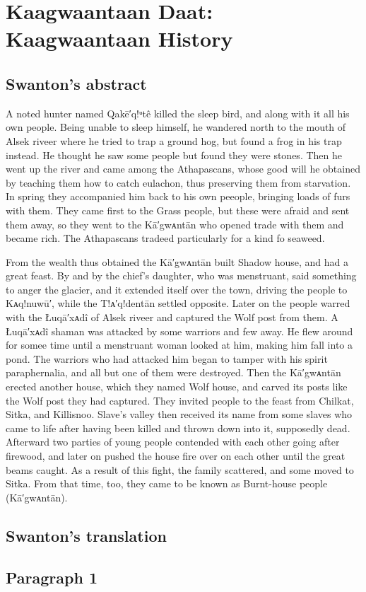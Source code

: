 
\resetexcnt
\chapter{Kaagwaantaan Daat: Kaagwaantaan History}\label{ch:104-kaagwaantaan-history}

\section{Swanton’s abstract}\label{sec:104-swanton-abstract}

A noted hunter named Qakē′q!ᵘtê killed the sleep bird, and along with it all his own people.
Being unable to sleep himself, he wandered north to the mouth of Alsek riveer where he tried to trap a ground hog, but found a frog in his trap instead.
He thought he saw some people but found they were stones.
Then he went up the river and came among the Athapascans, whose good will he obtained by teaching them how to catch eulachon, thus preserving them from starvation.
In spring they accompanied him back to his own peeople, bringing loads of furs with them.
They came first to the Grass people, but these were afraid and sent them away, so they went to the Kā′gwᴀntān who opened trade with them and became rich.
The Athapascans tradeed particularly for a kind fo seaweed.

From the wealth thus obtained the Kā′gwᴀntān built Shadow house, and had a great feast.
By and by the chief’s daughter, who was menstruant, said something to anger the glacier, and it extended itself over the town, driving the people to Kᴀq!nuwū′, while the T!ᴀ′q!dentān settled opposite.
Later on the people warred with the Łuqā′xᴀdî of Alsek riveer and captured the Wolf post from them.
A Łuqā′xᴀdî shaman was attacked by some warriors and few away.
He flew around for somee time until a menstruant woman looked at him, making him fall into a pond.
The warriors who had attacked him began to tamper with his spirit paraphernalia, and all but one of them were destroyed.
Then the Kā′gwᴀntān erected another house, which they named Wolf house, and carved its posts like the Wolf post they had captured.
They invited people to the feast from Chilkat, Sitka, and Killisnoo.
Slave’s valley then received its name from some slaves who came to life after having been killed and thrown down into it, supposedly dead.
Afterward two parties of young people contended with each other going after firewood, and later on pushed the house fire over on each other until the great beams caught.
As a result of this fight, the family scattered, and some moved to Sitka.
From that time, too, they came to be known as Burnt-house people (Kā′gwᴀntān).

\section{Swanton’s translation}\label{sec:104-swanton-translation}

\section{Paragraph 1}\label{sec:104-para-1}

